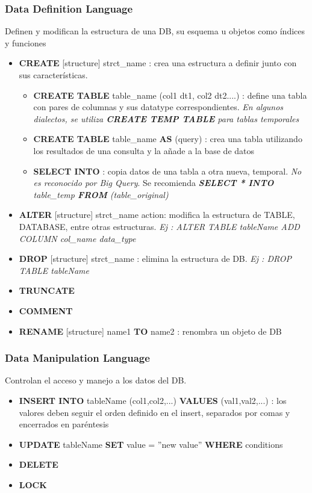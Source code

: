 \subsubsection{Data Definition Language}
Definen y modifican la estructura de una DB, su esquema u objetos como índices y funciones
\begin{itemize}
    \item {\textbf{CREATE} [structure] strct\_name : crea una estructura a definir junto con sus características.
    \begin{itemize}
        \item {\textbf{CREATE TABLE} table\_name (col1 dt1, col2 dt2....) : define una tabla con pares de columnas y sus \gls{datatype} correspondientes. \textit{En algunos dialectos, se utiliza \textbf{CREATE TEMP TABLE} para tablas temporales}}
        \item {\textbf{CREATE TABLE} table\_name \textbf{AS} (query) : crea una tabla utilizando los resultados de una consulta y la añade a la base de datos}
        \item {\textbf{SELECT INTO} : copia datos de una tabla a otra nueva, temporal. \textit{No es reconocido por Big Query}. Se recomienda \textit{\textbf{SELECT * INTO} table\_temp \textbf{FROM} (table\_original)}}
    \end{itemize}}
    \item {\textbf{ALTER} [structure] strct\_name {action}: modifica la estructura de TABLE, DATABASE, entre otras estructuras. \textit{Ej : ALTER TABLE tableName ADD COLUMN col\_name data\_type}}
    \item {\textbf{DROP} [structure] strct\_name :  elimina la estructura de DB. \textit{Ej : DROP TABLE tableName}}
    \item {\textbf{TRUNCATE}}
    \item {\textbf{COMMENT}}
    \item {\textbf{RENAME} [structure] name1 \textbf{TO} name2 : renombra un objeto de DB}
\end{itemize}

\subsubsection{Data Manipulation Language}
Controlan el acceso y manejo a los datos del DB.
\begin{itemize}
    \item {\textbf{INSERT INTO} tableName (col1,col2,...) \textbf{VALUES} (val1,val2,...) : los valores deben seguir el orden definido en el insert, separados por comas y encerrados en paréntesis}
    \item {\textbf{UPDATE} tableName \textbf{SET} value = ''new value'' \textbf{WHERE} {conditions}}
    \item {\textbf{DELETE}}
    \item {\textbf{LOCK}}
\end{itemize}

